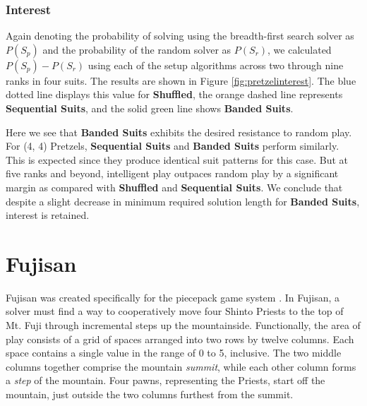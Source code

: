 \documentclass[journal]{IEEEtran}
\begin{document}



\subsubsection{Interest}

Again denoting the probability of solving using the breadth-first search solver as $P(S_p)$ and the probability of the random solver as $P(S_r)$, we calculated $P(S_p) - P(S_r)$ using each of the setup algorithms across two through nine ranks in four suits. The results are shown in Figure \ref{fig:pretzelinterest}. The blue dotted line displays this value for \textbf{Shuffled}, the orange dashed line represents \textbf{Sequential Suits}, and the solid green line shows \textbf{Banded Suits}.

Here we see that \textbf{Banded Suits} exhibits the desired resistance to random play. For (4, 4) Pretzels, \textbf{Sequential Suits} and \textbf{Banded Suits} perform similarly. This is expected since they produce identical suit patterns for this case. But at five ranks and beyond, intelligent play outpaces random play by a significant margin as compared with \textbf{Shuffled} and \textbf{Sequential Suits}. We conclude that despite a slight decrease in minimum required solution length for \textbf{Banded Suits}, interest is retained.



\section{Fujisan}
\noindent
Fujisan was created specifically for the piecepack game system \cite{GAMESYSTEM}. In Fujisan, a solver must find a way to cooperatively move four Shinto Priests to the top of Mt. Fuji through incremental steps up the mountainside. Functionally, the area of play consists of a grid of spaces arranged into two rows by twelve columns. Each space contains a single value in the range of 0 to 5, inclusive. The two middle columns together comprise the mountain {\it summit}, while each other column forms a {\it step} of the mountain. Four pawns, representing the Priests, start off the mountain, just outside the two columns furthest from the summit.
\end{document}
